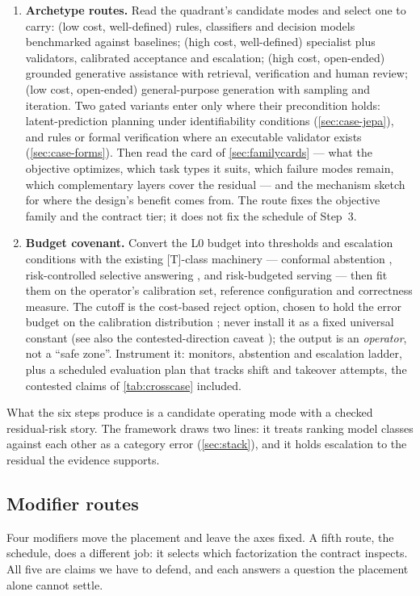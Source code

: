 \begin{enumerate}[leftmargin=1.6em, itemsep=2pt]
\item \textbf{Archetype routes.} Read the quadrant's candidate modes and select one to carry:
  (low cost, well-defined) rules, classifiers and decision models benchmarked against baselines;
  (high cost, well-defined) specialist plus validators, calibrated acceptance and escalation;
  (high cost, open-ended) grounded generative assistance with retrieval, verification and human
  review; (low cost, open-ended) general-purpose generation with sampling and iteration. Two gated
  variants enter only where their precondition holds: latent-prediction planning under
  identifiability conditions (\cref{sec:case-jepa}), and rules or formal verification where an
  executable validator exists (\cref{sec:case-forms}). Then read the card of
  \cref{sec:familycards} --- what the objective optimizes, which task types it suits, which
  failure modes remain, which complementary layers cover the residual --- and the mechanism
  sketch for where the design's benefit comes from. The route fixes the objective family and the
  contract tier; it does not fix the schedule of Step~3.

\item \textbf{Budget covenant.} Convert the L0 budget into thresholds and escalation conditions
  with the existing [T]-class machinery --- conformal abstention \cite{id240501563},
  risk-controlled selective answering \cite{id260704430}, and risk-budgeted serving
  \cite{id260933887} --- then fit them on the operator's calibration set, reference configuration
  and correctness measure. The cutoff is the cost-based reject option, chosen to hold the error
  budget on the calibration distribution \cite{geifman2017selective}; never install it as a fixed
  universal constant (see also the contested-direction caveat \cite{id260933843}); the output is an
  \emph{operator}, not a ``safe zone''. Instrument it: monitors, abstention and escalation ladder,
  plus a scheduled evaluation plan that tracks shift and takeover attempts, the contested claims of
  \cref{tab:crosscase} included.
\end{enumerate}
What the six steps produce is a candidate operating mode with a checked residual-risk story.
The framework draws two lines: it treats ranking model classes against each other as a
category error (\cref{sec:stack}), and it holds escalation to the residual the evidence supports.

\subsection{Modifier routes}
\label{sec:sel-modifiers}
Four modifiers move the placement and leave the axes fixed. A fifth route, the schedule, does a
different job: it selects which factorization the contract inspects. All five are claims we have
to defend, and each answers a question the placement alone cannot settle.

